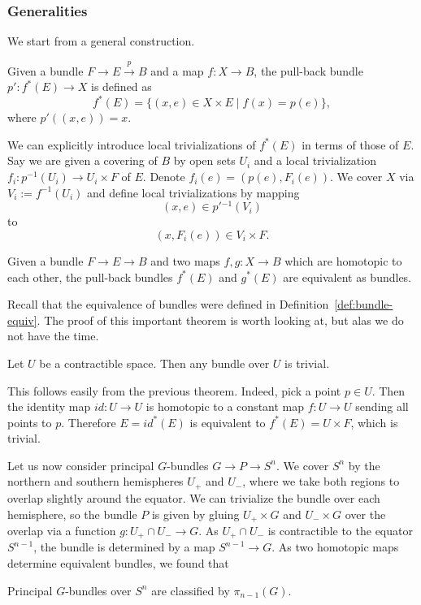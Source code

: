 \documentclass[12pt]{article}
\numberwithin{equation}{section}
\numberwithin{figure}{section}
\theoremstyle{remark}
\begin{document}
\subsubsection{Generalities}
We start from a general construction.
\begin{definition}
Given a bundle $F\to E\stackrel{p}{\longrightarrow} B$
and a map $f:X\to B$,
the pull-back bundle $p': f^*(E)\to X$ is defined as \begin{equation}
  f^*(E) = \{ (x,e)\in X\times E \mid f(x)=p(e) \},
\end{equation}
where $p'((x,e))=x$.
\end{definition}
We can explicitly introduce local trivializations of $f^*(E)$ in terms of those of $E$.
Say we are given a covering of $B$ by open sets $U_i$
and a local trivialization $f_i:p^{-1}(U_i)\to U_i\times F$ of $E$.
Denote $f_i(e)=(p(e),F_i(e))$.
We cover $X$ via $V_i:=f^{-1}(U_i)$ and define local trivializations by mapping \begin{equation}
(x,e) \in p'{}^{-1}(V_i) 
\end{equation} to \begin{equation}
(x,F_i(e)) \in V_i\times F.
\end{equation}

\begin{theorem}
\label{thm:bundle-equiv}
Given a bundle $F\to E\to B$
and two maps $f,g:X\to B$ which are homotopic to each other,
the pull-back bundles $f^*(E)$ and $g^*(E)$ are equivalent as bundles.
\end{theorem}
Recall that the equivalence of bundles were defined in Definition~\ref{def:bundle-equiv}.
The proof of this important theorem is worth looking at,
but alas we do not have the time.

\begin{proposition}
  Let $U$ be a contractible space.
  Then any bundle over $U$ is trivial.
\end{proposition}
This follows easily from the previous theorem.
Indeed, pick a point $p\in U$.
Then the identity map $id:U\to U$ is homotopic to a constant map $f:U\to U$ sending all points to $p$.
Therefore $E=id^*(E)$ is equivalent to $f^*(E)=U\times F$, which is trivial.

Let us now consider principal $G$-bundles  $G\to P\to S^n$.
We cover $S^n$ by the northern and southern hemispheres $U_+$ and $U_-$,
where we take both regions to overlap slightly around the equator.
We can trivialize the bundle over each hemisphere,
so the bundle $P$ is given by gluing
$U_+\times G$ and $U_-\times G$ over the overlap via a function
$g:U_+\cap U_-\to G$.
As $U_+\cap U_-$ is contractible to the equator $S^{n-1}$,
the bundle is determined by a map $S^{n-1} \to G$.
As two homotopic maps determine equivalent bundles,
we found that 
\begin{proposition}
  Principal $G$-bundles over $S^n$ are classified by $\pi_{n-1}(G)$.
\end{proposition}  
\end{document}
